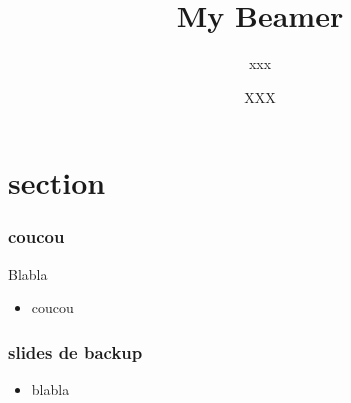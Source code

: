 \documentclass[10pt,aspectratio=169,english]{beamer}
\title[XXX]{\quad\newline \Large My Beamer}
\author[XXX]{XXX}
\institute{ \color{AmurmapleRed!60} xx xxxx xxxx}
\date{}
\subtitle{\large xxx}
\begin{document}
\maketitle

\sepframe[title={Sommaire}]

\section{section}
\begin{frame}
	\sectionpage
\end{frame}

\begin{frame}
	\frametitle{coucou}
	\hfill


Blabla
	\begin{itemize}
		\item coucou
	\end{itemize}

\end{frame}




\appendix

\begin{frame}
	\frametitle{slides de backup}
	\hfill
	
	\begin{itemize}
		\item blabla
	\end{itemize}	
\end{frame}
\end{document}
